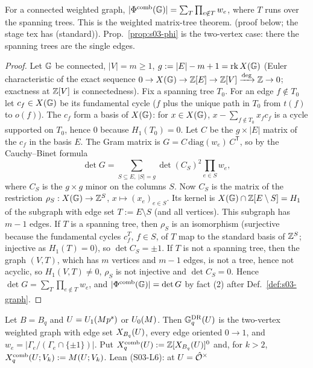 \begin{remark}\label{rem:s03-kirchhoff}
For a connected weighted graph, $|\Phi^{\mathrm{comb}}(\mathbb{G})|=\sum_{T}\prod_{e\notin T}w_e$, where $T$ runs over the spanning trees. This is the
weighted matrix-tree theorem. \stproved{} (proof below; the stage tex has \sttoprove{} (standard)). Prop.~\ref{prop:s03-phi} is the two-vertex case:
there the spanning trees are the single edges.
\end{remark}
\begin{proof}
Let $\mathbb{G}$ be connected, $|V|=m\ge1$, $g:=|E|-m+1=\operatorname{rk} X(\mathbb{G})$ (Euler characteristic of the exact sequence
$0\to X(\mathbb{G})\to\mathbb{Z}[E]\to\mathbb{Z}[V]\xrightarrow{\deg}\mathbb{Z}\to0$; exactness at $\mathbb{Z}[V]$ is connectedness). Fix a spanning tree $T_0$. For an edge
$f\notin T_0$ let $c_f\in X(\mathbb{G})$ be its fundamental cycle ($f$ plus the unique path in $T_0$ from $t(f)$ to $o(f)$). The $c_f$ form a basis of
$X(\mathbb{G})$: for $x\in X(\mathbb{G})$, $x-\sum_{f\notin T_0}x_fc_f$ is a cycle supported on $T_0$, hence $0$ because $H_1(T_0)=0$. Let $C$ be the $g\times|E|$
matrix of the $c_f$ in the basis $E$. The Gram matrix is $G=C\,\mathrm{diag}(w_e)\,C^{\mathsf T}$, so by the Cauchy--Binet formula
\[\det G=\sum_{S\subseteq E,\ |S|=g}\det(C_S)^2\prod_{e\in S}w_e,\]
where $C_S$ is the $g\times g$ minor on the columns $S$. Now $C_S$ is the matrix of the restriction $\rho_S:X(\mathbb{G})\to\mathbb{Z}^S$,
$x\mapsto(x_e)_{e\in S}$. Its kernel is $X(\mathbb{G})\cap\mathbb{Z}[E\setminus S]=H_1$ of the subgraph with edge set $T:=E\setminus S$ (and all vertices). This subgraph has
$m-1$ edges. If $T$ is a spanning tree, then $\rho_S$ is an isomorphism (surjective because the fundamental cycles $c^T_f$, $f\in S$, of $T$ map to the
standard basis of $\mathbb{Z}^S$; injective as $H_1(T)=0$), so $\det C_S=\pm1$. If $T$ is not a spanning tree, then the graph $(V,T)$, which has $m$ vertices and
$m-1$ edges, is not a tree, hence not acyclic, so $H_1(V,T)\ne0$, $\rho_S$ is not injective and $\det C_S=0$. Hence
$\det G=\sum_T\prod_{e\notin T}w_e$, and $|\Phi^{\mathrm{comb}}(\mathbb{G})|=\det G$ by fact (2) after Def.~\ref{def:s03-graph}.
\end{proof}

\begin{definition}\label{def:s03-DR}
Let $B=B_q$ and $U=U_1(Mp^s)$ or $U_0(M)$. Then $\mathbb{G}^{\mathrm{DR}}_q(U)$ is the two-vertex weighted graph with edge set $X_{B_q}(U)$, every edge
oriented $0\to1$, and $w_e=|\Gamma_e/(\Gamma_e\cap\{\pm1\})|$. Put $X^{\mathrm{comb}}_q(U):=\mathbb{Z}[X_{B_q}(U)]^0$ and, for $k>2$,
$X^{\mathrm{comb}}_q(U;V_k):=M(U;V_k)$.  Lean (S03-L6):  at
$U=\hat{\mathcal{O}}^\times$ \stformal{}
\end{definition}

